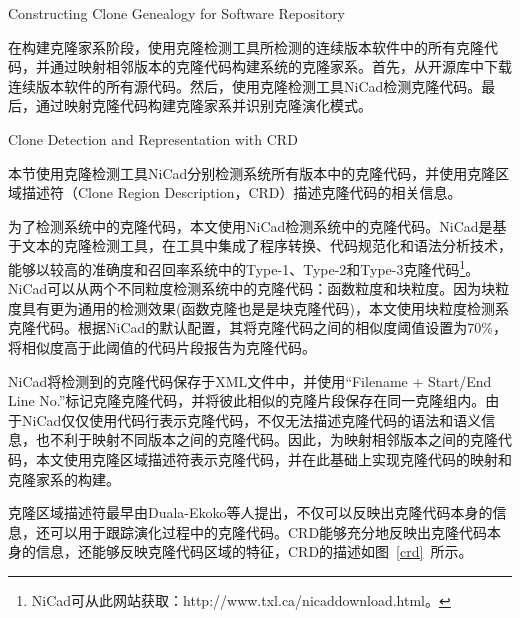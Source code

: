 

{Constructing Clone Genealogy for Software Repository}

在构建克隆家系阶段，使用克隆检测工具所检测的连续版本软件中的所有克隆代码，并通过映射相邻版本的克隆代码构建系统的克隆家系。首先，从开源库中下载连续版本软件的所有源代码。然后，使用克隆检测工具NiCad检测克隆代码。最后，通过映射克隆代码构建克隆家系并识别克隆演化模式。

{Clone Detection and Representation with CRD}

本节使用克隆检测工具NiCad分别检测系统所有版本中的克隆代码，并使用克隆区域描述符（Clone Region Description，CRD）描述克隆代码的相关信息。

为了检测系统中的克隆代码，本文使用NiCad\cite{roy2008nicad}检测系统中的克隆代码。NiCad是基于文本的克隆检测工具，在工具中集成了程序转换、代码规范化和语法分析技术\cite{cordy2006txl,dean2003agile}，能够以较高的准确度和召回率系统中的Type-1、Type-2和Type-3克隆代码\footnote{NiCad可从此网站获取：http://www.txl.ca/nicaddownload.html。}。NiCad可以从两个不同粒度检测系统中的克隆代码：函数粒度和块粒度。因为块粒度具有更为通用的检测效果(函数克隆也是是块克隆代码)，本文使用{块粒度}检测系克隆代码。根据NiCad的默认配置，其将克隆代码之间的相似度阈值设置为70\%，将相似度高于此阈值的代码片段报告为克隆代码。


NiCad将检测到的克隆代码保存于XML文件中，并使用{“Filename + Start/End Line No.”}标记克隆克隆代码，并将彼此相似的克隆片段保存在同一克隆组内。由于NiCad仅仅使用代码行表示克隆代码，不仅无法描述克隆代码的语法和语义信息，也不利于映射不同版本之间的克隆代码。因此，为映射相邻版本之间的克隆代码，本文使用克隆区域描述符表示克隆代码，并在此基础上实现克隆代码的映射和克隆家系的构建。

克隆区域描述符最早由Duala-Ekoko等人提出，不仅可以反映出克隆代码本身的信息，还可以用于跟踪演化过程中的克隆代码\cite{duala2010clone}。CRD能够充分地反映出克隆代码本身的信息，还能够反映克隆代码区域的特征，CRD的描述如图~\ref{crd}~所示。


